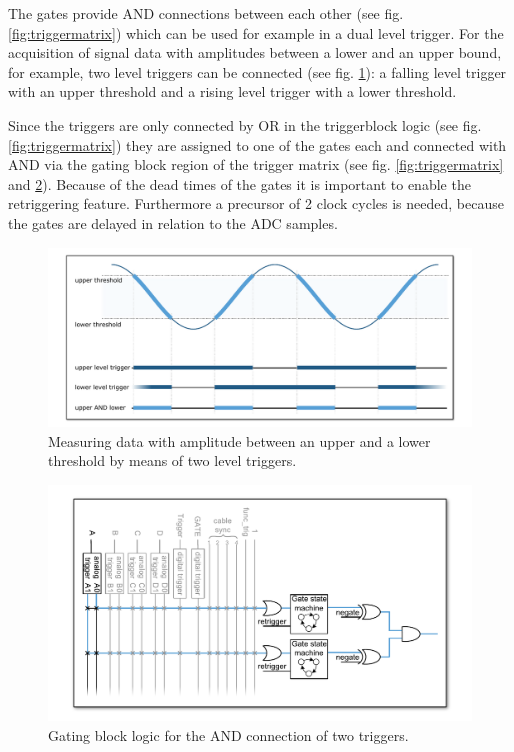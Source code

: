             The gates provide AND connections between each other (see fig. \ref{fig:triggermatrix}) which can be used for example in a dual level trigger. For the acquisition of signal data with amplitudes between a lower and an upper bound, for example, two level triggers can be connected (see fig. \ref{fig:dualleveltrig}): a falling level trigger with an upper threshold and a rising level trigger with a lower threshold.\par
            Since the triggers are only connected by OR in the triggerblock logic (see fig. \ref{fig:triggermatrix}) they are assigned to one of the gates each and connected with AND via the gating block region of the trigger matrix (see fig. \ref{fig:triggermatrix} and \ref{fig:dualleveltriglogic}). Because of the dead times of the gates it is important to enable the retriggering feature. Furthermore a precursor of 2 clock cycles is needed, because the gates are delayed in relation to the ADC samples.\par
            \begin{figure}[ht]
                \begin{center}
                    \includegraphics[width=\textwidth]{figures/dual_level_triggering.pdf}
                    \caption{\label{fig:dualleveltrig}Measuring data with amplitude between an upper and a lower threshold by means of two level triggers.}
                \end{center}
            \end{figure}

            \begin{figure}[ht]
                \begin{center}
                    \includegraphics[width=\textwidth]{figures/dual-level-triggering_logic.pdf}
                    \caption{\label{fig:dualleveltriglogic}Gating block logic for the AND connection of two triggers.}
                \end{center}
            \end{figure}

